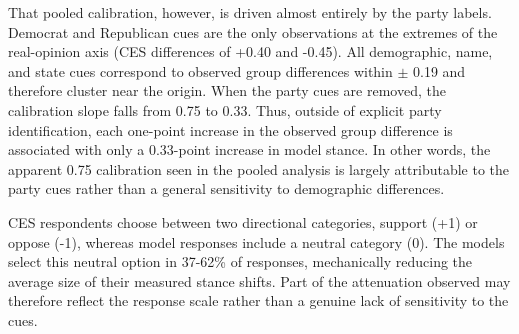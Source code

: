 That pooled calibration, however, is driven almost entirely by the party labels. Democrat and Republican cues are the only observations at the extremes of the real-opinion axis (CES differences of +0.40 and -0.45). All demographic, name, and state cues correspond to observed group differences within $\pm$ 0.19 and therefore cluster near the origin. When the party cues are removed, the calibration slope falls from 0.75 to 0.33. Thus, outside of explicit party identification, each one-point increase in the observed group difference is associated with only a 0.33-point increase in model stance. In other words, the apparent 0.75 calibration seen in the pooled analysis is largely attributable to the party cues rather than a general sensitivity to demographic differences.




CES respondents choose between two directional categories, support (+1) or oppose (-1), whereas model responses include a neutral category (0). The models select this neutral option in 37-62\% of responses, mechanically reducing the average size of their measured stance shifts. Part of the attenuation observed may therefore reflect the response scale rather than a genuine lack of sensitivity to the cues.

